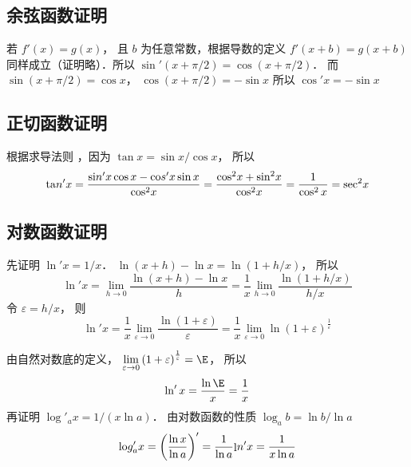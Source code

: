 \subsection{余弦函数证明}
若 $f'\left( x \right) = g\left( x \right)$， 且 $b$ 为任意常数，根据导数的定义 $f'(x + b) = g(x + b)$ 同样成立（证明略）．所以 $\sin'(x + \pi/2) = \cos(x + {\pi }/{2})$． 而 $\sin(x + {\pi }/{2}) = \cos x$，  $\cos(x + {\pi }/{2}) =  - \sin x$ 所以 $\cos' x =  - \sin x$

\subsection{正切函数证明}
根据求导法则%
，因为 $\tan x = {{\sin x}}/{{\cos x}}$， 所以
 \begin{equation}
{\mathop{\rm ta}\nolimits} n'x = \frac{{{\mathop{\rm si}\nolimits} n'x\cos x - {\mathop{\rm co}\nolimits} s'x\sin x}}{{{{\cos }^2}x}} = \frac{{{{\cos }^2}x + {{\sin }^2}x}}{{{{\cos }^2}x}} = \frac{1}{\cos ^2 x} = {\sec ^2}x
\end{equation}
\subsection{对数函数证明}
先证明 $\ln' x = {1}/{x}$．  $\ln \left( {x + h} \right) - \ln x = \ln \left( {1 + h/x} \right)$， 所以
 \begin{equation}
\ln 'x = \mathop {\lim }\limits_{h \to 0} \frac{{\ln \left( {x + h} \right) - \ln x}}{h} = \frac{1}{x}\mathop {\lim }\limits_{h \to 0} \frac{{\ln \left( {1 + h/x} \right)}}{{h/x}}
\end{equation}
令 $\varepsilon  = h/x$， 则
\begin{equation}
\ln' x = \frac{1}{x}\mathop {\lim }\limits_{\varepsilon  \to 0} \frac{{\ln \left( {1 + \varepsilon } \right)}}{\varepsilon } = \frac{1}{x}\mathop {\lim }\limits_{\varepsilon  \to 0} \ln {\left( {1 + \varepsilon } \right)^{\frac{1}{\varepsilon }}} 
\end{equation}
 
由自然对数底的定义， $\mathop {\lim }\limits_{\varepsilon  \to 0} {\left( {1 + \varepsilon } \right)^{\frac{1}{\varepsilon }}} = \E$， 所以
 \begin{equation}
\ln 'x = \frac{{\ln \E}}{x} = \frac{1}{x}
\end{equation}
再证明 ${\log'_a}x = {1}/{(x\ln a)}$． 
由对数函数的性质 ${\log _a}b = {{\ln b}}/{{\ln a}}$
\begin{equation}
{\mathop{\rm lo}\nolimits} {g'_a}x = {\left( {\frac{{\ln x}}{{\ln a}}} \right)^\prime } = \frac{1}{{\ln a}}{\mathop{\rm l}\nolimits} n'x = \frac{1}{{x\ln a}}
\end{equation}

